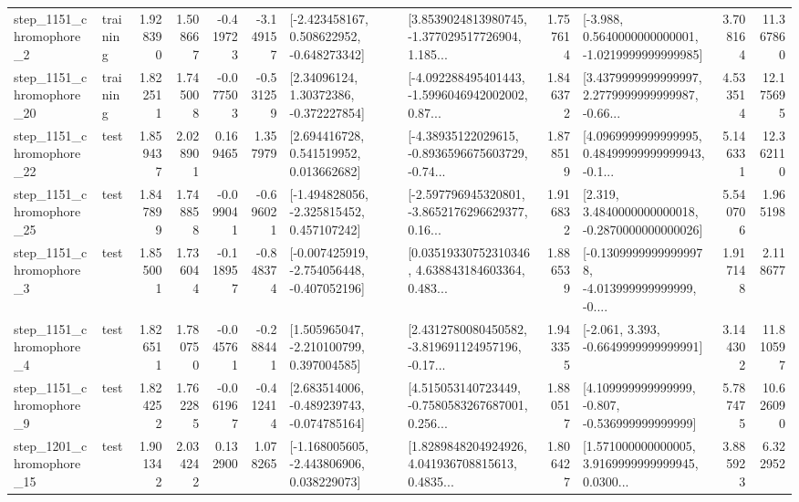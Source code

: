 \begin{tabular}{llrrrrllrlrr}
  step\_1151\_chromophore\_2 &  training &      1.928390 &    1.508667 &     -0.419723 & -3.149157 &   [-2.423458167, 0.508622952, -0.648273342] &  [3.8539024813980745, -1.377029517726904, 1.185... &       1.757614 &  [-3.988, 0.5640000000000001, -1.0219999999999985] &            3.708164 &         11.367860 \\
 step\_1151\_chromophore\_20 &  training &      1.822511 &    1.745008 &     -0.077503 & -0.531259 &      [2.34096124, 1.30372386, -0.372227854] &  [-4.092288495401443, -1.5996046942002002, 0.87... &       1.846372 &  [3.4379999999999997, 2.2779999999999987, -0.66... &            4.533514 &         12.175695 \\
 step\_1151\_chromophore\_22 &      test &      1.859437 &    2.028901 &      0.169465 &  1.357979 &     [2.694416728, 0.541519952, 0.013662682] &  [-4.38935122029615, -0.8936596675603729, -0.74... &       1.878519 &  [4.0969999999999995, 0.48499999999999943, -0.1... &            5.146331 &         12.362110 \\
 step\_1151\_chromophore\_25 &      test &      1.847899 &    1.748858 &     -0.099041 & -0.696021 &   [-1.494828056, -2.325815452, 0.457107242] &  [-2.597796945320801, -3.8652176296629377, 0.16... &       1.916832 &   [2.319, 3.4840000000000018, -0.2870000000000026] &            5.540706 &          1.965198 \\
  step\_1151\_chromophore\_3 &      test &      1.855001 &    1.736044 &     -0.118957 & -0.848374 &  [-0.007425919, -2.754056448, -0.407052196] &  [0.03519330752310346, 4.638843184603364, 0.483... &       1.886539 &  [-0.13099999999999978, -4.013999999999999, -0.... &            1.917148 &          2.118677 \\
  step\_1151\_chromophore\_4 &      test &      1.826511 &    1.780750 &     -0.045761 & -0.288441 &    [1.505965047, -2.210100799, 0.397004585] &  [2.4312780080450582, -3.819691124957196, -0.17... &       1.943355 &               [-2.061, 3.393, -0.6649999999999991] &            3.144302 &         11.810597 \\
  step\_1151\_chromophore\_9 &      test &      1.824252 &    1.762285 &     -0.061967 & -0.412414 &   [2.683514006, -0.489239743, -0.074785164] &  [4.515053140723449, -0.7580583267687001, 0.256... &       1.880517 &    [4.109999999999999, -0.807, -0.536999999999999] &            5.787475 &         10.626090 \\
 step\_1201\_chromophore\_15 &      test &      1.901342 &    2.034242 &      0.132900 &  1.078265 &   [-1.168005605, -2.443806906, 0.038229073] &  [1.8289848204924926, 4.041936708815613, 0.4835... &       1.806427 &  [1.571000000000005, 3.9169999999999945, 0.0300... &            3.885923 &          6.322952 \\

\end{tabular}
